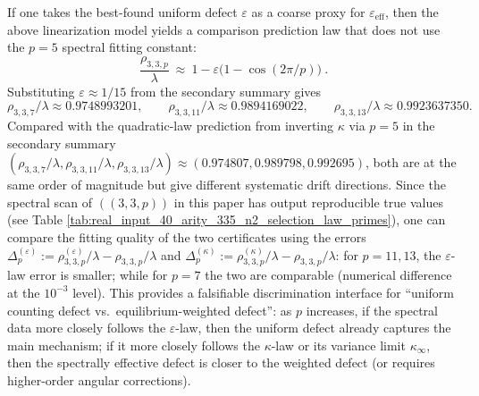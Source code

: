 \begin{remark}\label{rem:arity-335-eps-law-prediction}
If one takes the best-found uniform defect \(\varepsilon\) as a coarse proxy for \(\varepsilon_{\mathrm{eff}}\), then the above linearization model yields a comparison prediction law that does not use the \(p=5\) spectral fitting constant:
$$
\boxed{\
\frac{\rho_{3,3,p}}{\lambda}
\ \approx\
1-\varepsilon\bigl(1-\cos(2\pi/p)\bigr)\ }.
$$
Substituting \(\varepsilon\approx 1/15\) from the secondary summary gives
$$
\rho_{3,3,7}/\lambda\approx 0.9748993201,\qquad
\rho_{3,3,11}/\lambda\approx 0.9894169022,\qquad
\rho_{3,3,13}/\lambda\approx 0.9923637350.
$$
Compared with the quadratic-law prediction from inverting \(\kappa\) via \(p=5\) in the secondary summary
\(
(\rho_{3,3,7}/\lambda,\rho_{3,3,11}/\lambda,\rho_{3,3,13}/\lambda)\approx
(0.974807,0.989798,0.992695)
\),
both are at the same order of magnitude but give different systematic drift directions.
Since the spectral scan of \(((3,3,p))\) in this paper has output reproducible true values (see Table \ref{tab:real_input_40_arity_335_n2_selection_law_primes}), one can compare the fitting quality of the two certificates using the errors
\(
\Delta_p^{(\varepsilon)}:=\rho_{3,3,p}^{(\varepsilon)}/\lambda-\rho_{3,3,p}/\lambda
\)
and
\(
\Delta_p^{(\kappa)}:=\rho_{3,3,p}^{(\kappa)}/\lambda-\rho_{3,3,p}/\lambda
\):
for \(p=11,13\), the \(\varepsilon\)-law error is smaller; while for \(p=7\) the two are comparable (numerical difference at the \(10^{-3}\) level).
This provides a falsifiable discrimination interface for ``uniform counting defect vs.\ equilibrium-weighted defect'': as \(p\) increases, if the spectral data more closely follows the \(\varepsilon\)-law, then the uniform defect already captures the main mechanism; if it more closely follows the \(\kappa\)-law or its variance limit \(\kappa_\infty\), then the spectrally effective defect is closer to the weighted defect (or requires higher-order angular corrections).
\end{remark}

